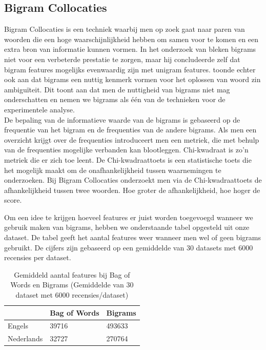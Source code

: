 \subsection{Bigram Collocaties}\label{Bigram Collocaties}

Bigram Collocaties is een techniek waarbij men op zoek gaat naar paren van woorden die een hoge waarschijnlijkheid hebben om samen voor te komen en een extra bron van informatie kunnen vormen. In het onderzoek van \cite{pang2002thumbs} bleken bigrams niet voor een verbeterde prestatie te zorgen, maar hij concludeerde zelf dat bigram features mogelijks evenwaardig zijn met unigram features. \cite{pedersen2001decision} toonde echter ook aan dat bigrams een nuttig kenmerk vormen voor het oplossen van woord zin ambigu\"iteit. Dit toont aan dat men de nuttigheid van bigrams niet mag onderschatten en nemen we bigrams als \'e\'en van de technieken voor de experimentele analyse.\\

De bepaling van de informatieve waarde van de bigrams is gebaseerd op de frequentie van het bigram en de frequenties van de andere bigrams. Als men een overzicht krijgt over de frequenties introduceert men een metriek, die met behulp van de frequenties mogelijke verbanden kan blootleggen. Chi-kwadraat is zo'n metriek die er zich toe leent. De Chi-kwadraattoets is een statistische toets die het mogelijk maakt om de onafhankelijkheid tussen waarnemingen te onderzoeken. Bij Bigram Collocaties onderzoekt men via de Chi-kwadraattoets de afhankelijkheid tussen twee woorden. Hoe groter de afhankelijkheid, hoe hoger de score. 

Om een idee te krijgen hoeveel features er juist worden toegevoegd wanneer we gebruik maken van bigrams, hebben we onderstaande tabel opgesteld uit onze dataset. De tabel geeft het aantal features weer wanneer men wel of geen bigrams gebruikt. De cijfers zijn gebaseerd op een gemiddelde van 30 datasets met 6000 recensies per dataset.

\begin{table}[h]
\centering
\begin{tabular}{l|l|l|}
\cline{2-3}
                                 & Bag of Words & Bigrams \\ \hline
\multicolumn{1}{|l|}{Engels}     & 39716        & 493633  \\ \hline
\multicolumn{1}{|l|}{Nederlands} & 32727        & 270764  \\ \hline
\end{tabular}
\caption{Gemiddeld aantal features bij Bag of Words en Bigrams (Gemiddelde van 30 dataset met 6000 recensies/dataset)}
\end{table}

